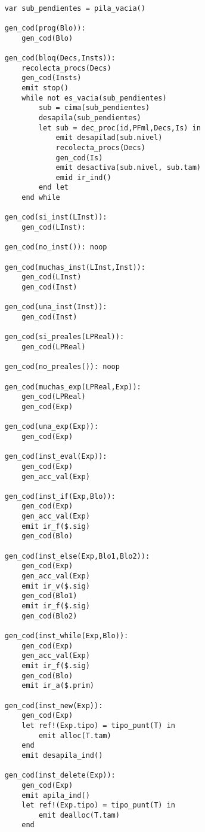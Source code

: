 
\begin{lstlisting}

    var sub_pendientes = pila_vacia()

    gen_cod(prog(Blo)):
        gen_cod(Blo)

    gen_cod(bloq(Decs,Insts)):
        recolecta_procs(Decs)
        gen_cod(Insts)
        emit stop()
        while not es_vacia(sub_pendientes)
            sub = cima(sub_pendientes)
            desapila(sub_pendientes)
            let sub = dec_proc(id,PFml,Decs,Is) in
                emit desapilad(sub.nivel)
                recolecta_procs(Decs)
                gen_cod(Is)
                emit desactiva(sub.nivel, sub.tam)
                emid ir_ind()
            end let
        end while

    gen_cod(si_inst(LInst)):
        gen_cod(LInst):

    gen_cod(no_inst()): noop

    gen_cod(muchas_inst(LInst,Inst)):
        gen_cod(LInst)
        gen_cod(Inst)

    gen_cod(una_inst(Inst)):
        gen_cod(Inst)

    gen_cod(si_preales(LPReal)):
        gen_cod(LPReal)

    gen_cod(no_preales()): noop

    gen_cod(muchas_exp(LPReal,Exp)):
        gen_cod(LPReal)
        gen_cod(Exp)

    gen_cod(una_exp(Exp)):
        gen_cod(Exp)

    gen_cod(inst_eval(Exp)):
        gen_cod(Exp)
        gen_acc_val(Exp)

    gen_cod(inst_if(Exp,Blo)):
        gen_cod(Exp)
        gen_acc_val(Exp)
        emit ir_f($.sig)
        gen_cod(Blo)

    gen_cod(inst_else(Exp,Blo1,Blo2)):
        gen_cod(Exp)
        gen_acc_val(Exp)
        emit ir_v($.sig)
        gen_cod(Blo1)
        emit ir_f($.sig)
        gen_cod(Blo2)

    gen_cod(inst_while(Exp,Blo)):
        gen_cod(Exp)
        gen_acc_val(Exp)
        emit ir_f($.sig)
        gen_cod(Blo)
        emit ir_a($.prim)

    gen_cod(inst_new(Exp)):
        gen_cod(Exp)
        let ref!(Exp.tipo) = tipo_punt(T) in
            emit alloc(T.tam)
        end
        emit desapila_ind()

    gen_cod(inst_delete(Exp)):
        gen_cod(Exp)
        emit apila_ind()
        let ref!(Exp.tipo) = tipo_punt(T) in
            emit dealloc(T.tam)
        end


\end{lstlisting}
